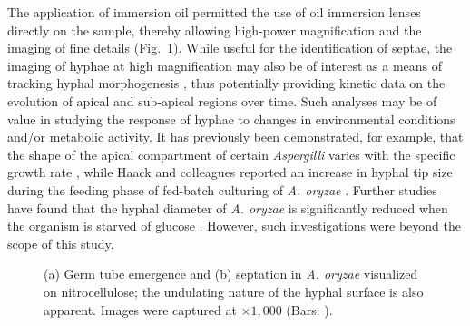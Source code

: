 The application of immersion oil permitted the use of oil immersion lenses directly on the sample, thereby allowing high-power magnification and the imaging of fine details (Fig.~\ref{fig:HighMags}). While useful for the identification of septae, the imaging of hyphae at high magnification may also be of interest as a means of tracking hyphal morphogenesis \cite{dieguez-uribeondo2004}, thus potentially providing kinetic data on the evolution of apical and sub-apical regions over time. Such analyses may be of value in studying the response of hyphae to changes in environmental conditions and/or metabolic activity. It has previously been demonstrated, for example, that the shape of the apical compartment of certain \emph{Aspergilli} varies with the specific growth rate \cite{muller2000}, while Haack and colleagues reported an increase in hyphal tip size during the feeding phase of fed-batch culturing of \emph{A. oryzae} \cite{haack2006}. Further studies have found that the hyphal diameter of \emph{A. oryzae} is significantly reduced when the organism is starved of glucose \cite{pollack2008}. However, such investigations were beyond the scope of this study.

\begin{figure}[htbp]
	\centering
	\hspace{0.5cm}
	\caption{(a) Germ tube emergence and (b) septation in \emph{A. oryzae} visualized on nitrocellulose; the undulating nature of the hyphal surface is also apparent. Images were captured at $\times 1,000$ (Bars: ).}
	\label{fig:HighMags}
\end{figure}

